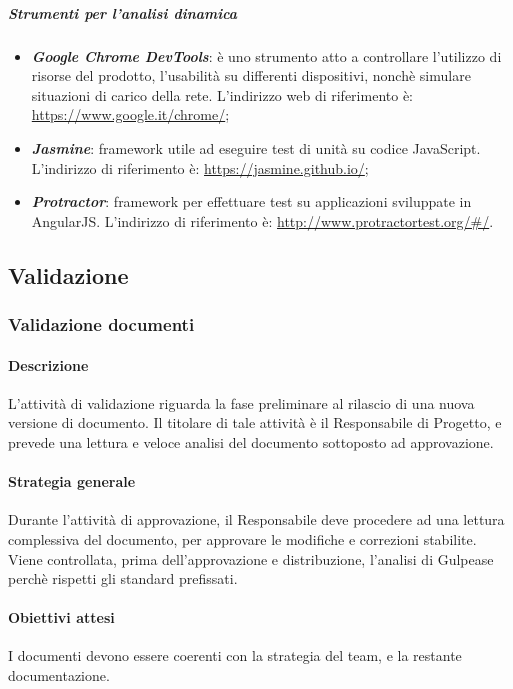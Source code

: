 	\subparagraph{Strumenti per l'analisi dinamica}
		\begin{itemize}
			\item \textbf{\textit{Google Chrome DevTools}}: è uno strumento atto a controllare l'utilizzo di risorse del prodotto, l'usabilità su differenti dispositivi, nonchè simulare situazioni di carico della rete. L'indirizzo web di riferimento è: \url{https://www.google.it/chrome/};
			\item \textbf{\textit{Jasmine}}: framework utile ad eseguire test di unità su codice JavaScript. L'indirizzo di riferimento è: \url{https://jasmine.github.io/};
			\item \textbf{\textit{Protractor}}: framework per effettuare test su applicazioni sviluppate in AngularJS. L'indirizzo di riferimento è: \url{http://www.protractortest.org/#/}.
		\end{itemize}
	\newpage
	\subsection{Validazione}
	
	\subsubsection{Validazione documenti}
	
	\paragraph{Descrizione}
	L’attività di validazione riguarda la fase preliminare al rilascio di una nuova versione di documento. Il titolare di tale attività è il Responsabile di Progetto, e prevede una lettura e veloce analisi del documento sottoposto ad approvazione. 
	
	\paragraph{Strategia generale}
	Durante l'attività di approvazione, il Responsabile deve procedere ad una lettura complessiva del documento, per approvare le modifiche e correzioni stabilite. Viene controllata, prima dell'approvazione e distribuzione, l'analisi di Gulpease perchè rispetti gli standard prefissati.

	\paragraph{Obiettivi attesi}
	I documenti devono essere coerenti con la strategia del team, e la restante documentazione.	
	
